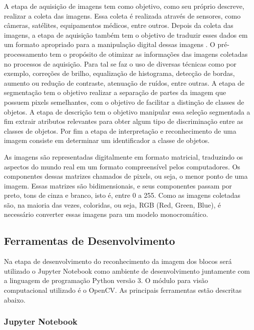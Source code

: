 A etapa de aquisição de imagens tem como objetivo, como seu próprio descreve, realizar a coleta das imagens. Essa coleta é realizada através de sensores, como câmeras, satélites, equipamentos médicos, entre outros. Depois da coleta das imagens, a etapa de aquisição também tem o objetivo de traduzir esses dados em um formato apropriado para a manipulação digital dessas imagens \cite{schwartz_2007}. O pré-processamento tem o propósito de otimizar as informações das imagens coletadas no processos de aquisição. Para tal se faz o uso de diversas técnicas como por exemplo, correções de brilho, equalização de histograma, detecção de bordas, aumento ou redução de contraste, atenuação de ruídos, entre outras. 
A etapa de segmentação tem o objetivo realizar a separação de partes da imagem que possuem pixels semelhantes, com o objetivo de facilitar a distinção de classes de objetos.  
A etapa de descrição tem o objetivo manipular essa seleção segmentada a fim extrair atributos relevantes para obter algum tipo de discriminação entre as classes de objetos. 
Por fim a etapa de interpretação e reconhecimento de uma imagem consiste em determinar um identificador a classe de objetos. 



As imagens são representadas digitalmente em formato matricial, traduzindo os aspectos do mundo real em um formato compreensível pelos computadores. Os componentes dessas matrizes chamados de pixels, ou seja, o menor ponto de uma imagem.
Essas matrizes são bidimensionais, e seus componentes passam por preto, tons de cinza e branco, isto é, entre 0 a 255. Como as imagens coletadas são, na maioria das vezes, coloridas, ou seja, RGB (Red, Green, Blue), é necessário converter essas imagens para um modelo monocromático.





\subsection{Ferramentas de Desenvolvimento}	

    Na etapa de desenvolvimento do reconhecimento da imagem dos blocos será utilizado o Jupyter Notebook como ambiente de desenvolvimento juntamente com a linguagem de programação Python versão 3. O módulo para visão computacional utilizado é o OpenCV. As principais ferramentas estão descritas abaixo.	


    \subsubsection{Jupyter Notebook}	

